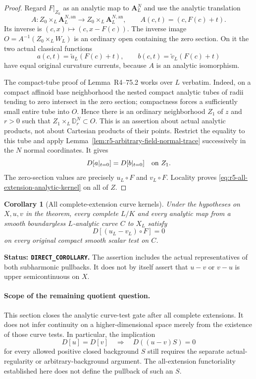\documentclass[11pt,a4paper]{article}
\numberwithin{equation}{section}
\newtheorem{corollary}[theorem]{Corollary}
\theoremstyle{definition}
\theoremstyle{remark}
\begin{document}
\begin{proof}
Regard $F|_{Z_0}$ as an analytic map to $\mathbf A_L^N$ and use
the analytic translation
\[
 A:Z_0\times_L\mathbf A_L^{N,\mathrm{an}}\longrightarrow
          Z_0\times_L\mathbf A_L^{N,\mathrm{an}},\qquad
 A(c,t)=(c,F(c)+t).
\]
Its inverse is $(c,x)\mapsto(c,x-F(c))$.  The inverse image
$O=A^{-1}(Z_0\times_L W_L)$ is an ordinary open containing the
zero section.  On it the two actual classical functions
\[
 a(c,t)=\widetilde u_L(F(c)+t),\qquad
 b(c,t)=\widetilde v_L(F(c)+t)
\]
have equal original curvature currents, because $A$ is an analytic
isomorphism.

The compact-tube proof of Lemma~\textup{R4--75.2}
works over $L$ verbatim.  Indeed, on a compact affinoid base
neighborhood the nested compact analytic tubes of radii tending
to zero intersect in the zero section; compactness forces a
sufficiently small entire tube into $O$.  Hence there is an
ordinary neighborhood $Z_1$ of $z$ and $r>0$ such that
$Z_1\times_L\mathbb D_r^N\subset O$.  This is an assertion
about actual analytic products, not about Cartesian products of
their points.  Restrict the equality to this tube and apply
Lemma~\ref{lem:r5-arbitrary-field-normal-trace} successively in
the $N$ normal coordinates.  It gives
\[
                       D[a|_{t=0}]=D[b|_{t=0}]
                              \quad\hbox{on }Z_1.
\]
The zero-section values are precisely $u_L\circ F$ and
$v_L\circ F$.  Locality proves
\eqref{eq:r5-all-extension-analytic-kernel} on all of $Z$.
\end{proof}

\begin{corollary}[All complete-extension curve kernels]
\label{cor:r5-all-extension-curve-kernel}
Under the hypotheses on $X,u,v$ in the theorem, every complete
$L/K$ and every analytic map from a smooth boundaryless
$L$-analytic curve $C$ to $X_L$ satisfy
\[
                 D[(u_L-v_L)\circ F]=0
\]
on every original compact smooth scalar test on $C$.
\end{corollary}

\noindent\textbf{Status: \texttt{DIRECT\_COROLLARY}.}
The assertion includes the actual representatives of both
subharmonic pullbacks.  It does not by itself assert that
$u-v$ or $v-u$ is upper semicontinuous on $X$.

\paragraph{Scope of the remaining quotient question.}
This section closes the analytic curve-test gate after all complete
extensions.  It does not infer continuity on a higher-dimensional
space merely from the existence of those curve tests.  In
particular, the implication
\[
       D[u]=D[v]\quad\Longrightarrow\quad D((u-v)S)=0
\]
for every allowed positive closed background $S$ still requires
the separate actual-regularity or arbitrary-background argument.
The all-extension functoriality established here does not define
the pullback of such an $S$.
\end{document}
